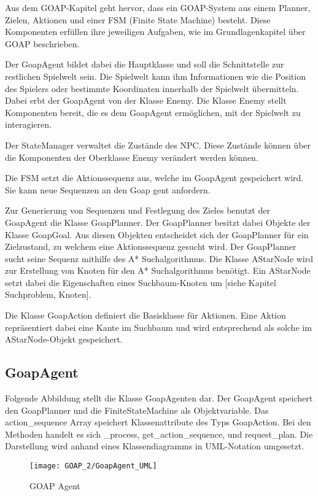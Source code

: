 Aus dem GOAP-Kapitel geht hervor, dass ein GOAP-System aus einem Planner, Zielen, Aktionen und einer FSM (Finite State Machine) besteht. Diese Komponenten erfüllen ihre jeweiligen Aufgaben, wie im Grundlagenkapitel über GOAP beschrieben.

Der GoapAgent bildet dabei die Hauptklasse und soll die Schnittstelle zur restlichen Spielwelt sein. Die Spielwelt kann ihm Informationen wie die Position des Spielers oder bestimmte Koordinaten innerhalb der Spielwelt übermitteln. Dabei erbt der GoapAgent von der Klasse Enemy. Die Klasse Enemy stellt Komponenten bereit, die es dem GoapAgent ermöglichen, mit der Spielwelt zu interagieren.

Der StateManager verwaltet die Zustände des NPC. Diese Zustände können über die Komponenten der Oberklasse Enemy verändert werden können.

Die FSM setzt die Aktionssequenz aus, welche im GoapAgent gespeichert wird. Sie kann neue Sequenzen an den Goap gent anfordern.

Zur Generierung von Sequenzen und Festlegung des Zieles benutzt der GoapAgent die Klasse GoapPlanner. Der GoapPlanner besitzt dabei Objekte der Klasse GoapGoal. Aus diesen Objekten entscheidet sich der GoapPlanner für ein Zielzustand, zu welchem eine Aktionssequenz gesucht wird.
Der GoapPlanner sucht seine Sequenz mithilfe des A* Suchalgorithmus. Die Klasse AStarNode wird zur Erstellung von Knoten für den A* Suchalgorithmus benötigt. Ein AStarNode setzt dabei die Eigenschaften eines Suchbaum-Knoten um [siehe Kapitel Suchproblem, Knoten].

Die Klasse GoapAction definiert die Basisklasse für Aktionen. Eine Aktion repräsentiert dabei eine Kante im Suchbaum und wird entsprechend als solche im AStarNode-Objekt gespeichert.



\subsection{GoapAgent}

Folgende Abbildung stellt die Klasse GoapAgenten dar. Der GoapAgent speichert den GoapPlanner und die FiniteStateMachine als Objektvariable. Das action\_sequence Array speichert Klassenattribute des Typs GoapAction. Bei den Methoden handelt es sich \_process, get\_action\_sequence, und request\_plan. Die Darstellung wird anhand eines Klassendiagramms in UML-Notation umgesetzt.

\begin{figure}[h]
  \centering
  \texttt{[image: GOAP\_2/GoapAgent\_UML]}
	\captionsetup{justification=justified, format=plain}
  \caption{GOAP Agent}
  \label{GOAP Agent}
\end{figure}


